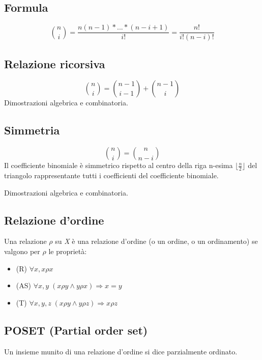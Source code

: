\subsection{Formula} 
\[\binom{n}{i}=\frac{n(n-1)\ast ... \ast (n-i+1)}{i!} = \frac{n!}{i!(n-i)!}\]

\subsection{Relazione ricorsiva}
\[\binom{n}{i}=\binom{n-1}{i-1}+\binom{n-1}{i}\]
Dimostrazioni algebrica e combinatoria.

\subsection{Simmetria}
\[\binom{n}{i}=\binom{n}{n-i}\]
Il coefficiente binomiale è simmetrico rispetto al centro della riga n-esima \(\lfloor\frac{n}{2}\rfloor\) del triangolo rappresentante tutti i coefficienti del coefficiente binomiale.

Dimostrazioni algebrica e combinatoria.

\subsection{Relazione d'ordine}
Una relazione \(\rho\) su \textit{X} è una relazione d'ordine (o un ordine, o un ordinamento) se valgono per \(\rho\) le proprietà:
\begin{itemize}
    \item (R) \(\forall x, x\rho x\)
    \item (AS) \(\forall x,y\; (x\rho y\land y\rho x)\Rightarrow x=y\)
    \item (T) \(\forall x,y,z\; (x\rho y\land y\rho z)\Rightarrow x\rho z\)
\end{itemize}

\subsection{POSET (Partial order set)}
Un insieme munito di una relazione d'ordine si dice parzialmente ordinato.
